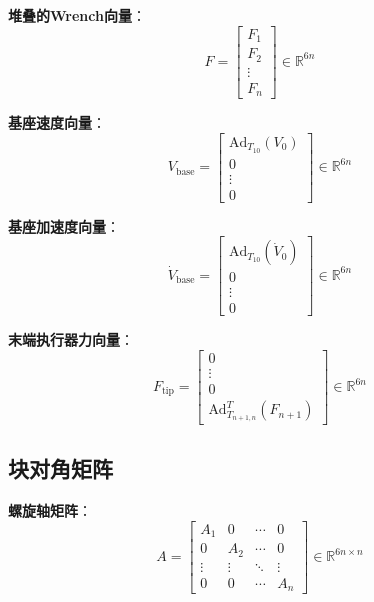 \documentclass[12pt,a4paper]{article}
\begin{document}
\textbf{堆叠的Wrench向量}：
\begin{equation}
F = \begin{bmatrix} F_1 \\ F_2 \\ \vdots \\ F_n \end{bmatrix} \in \mathbb{R}^{6n}
\label{eq:stacked_F}
\end{equation}

\textbf{基座速度向量}：
\begin{equation}
V_{\text{base}} = \begin{bmatrix} \text{Ad}_{T_{10}}(V_0) \\ 0 \\ \vdots \\ 0 \end{bmatrix} \in \mathbb{R}^{6n}
\label{eq:V_base}
\end{equation}

\textbf{基座加速度向量}：
\begin{equation}
\dot{V}_{\text{base}} = \begin{bmatrix} \text{Ad}_{T_{10}}(\dot{V}_0) \\ 0 \\ \vdots \\ 0 \end{bmatrix} \in \mathbb{R}^{6n}
\label{eq:V_dot_base}
\end{equation}

\textbf{末端执行器力向量}：
\begin{equation}
F_{\text{tip}} = \begin{bmatrix} 0 \\ \vdots \\ 0 \\ \text{Ad}_{T_{n+1,n}}^T(F_{n+1}) \end{bmatrix} \in \mathbb{R}^{6n}
\label{eq:F_tip}
\end{equation}

\subsection{块对角矩阵}

\textbf{螺旋轴矩阵}：
\begin{equation}
A = \begin{bmatrix}
A_1 & 0 & \cdots & 0 \\
0 & A_2 & \cdots & 0 \\
\vdots & \vdots & \ddots & \vdots \\
0 & 0 & \cdots & A_n
\end{bmatrix} \in \mathbb{R}^{6n \times n}
\label{eq:matrix_A}
\end{equation}
\end{document}
